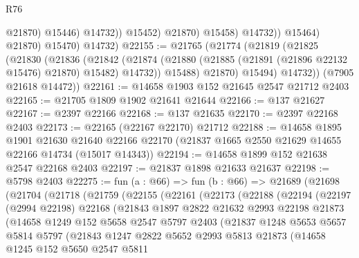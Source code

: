 \begin{lexlean}{R76}
\begin{coremodule}
                              @21870)
                            @15446)
                          @14732))
                      @15452)
                    @21870)
                  @15458)
                @14732))
            @15464)
          @21870)
        @15470)
      @14732)
@22155 := @21765
    (@21774
      (@21819
        (@21825
          (@21830
            (@21836
              (@21842
                (@21874 (@21880 (@21885 (@21891 (@21896 @22132 @15476) @21870) @15482) @14732))
                @15488)
              @21870)
            @15494)
          @14732))
      (@7905 @21618 @14472))
@22161 := @14658 @1903 @152 @21645 @2547 @21712 @2403
@22165 := @21705 @1809 @1902 @21641 @21644
@22166 := @137 @21627
@22167 := @2397 @22166
@22168 := @137 @21635
@22170 := @2397 @22168 @2403
@22173 := @22165 (@22167 @22170) @21712
@22188 := @14658
    @1895
    @1901
    @21630
    @21640
    @22166
    @22170
    (@21837 @1665 @2550 @21629 @14655 @22166 @14734 (@15017 @14343))
@22194 := @14658 @1899 @152 @21638 @2547 @22168 @2403
@22197 := @21837 @1898 @21633 @21637
@22198 := @5798 @2403
@22275 := fun (a : @66) =>
  fun (b : @66) =>
  @21689
    (@21698
      (@21704
        (@21718
          (@21759
            (@22155
              (@22161
                (@22173
                  (@22188
                    (@22194
                      (@22197
                        (@2994 @22198)
                        @22168
                        (@21843
                          @1897
                          @2822
                          @21632
                          @2993
                          @22198
                          @21873
                          (@14658
                            @1249
                            @152
                            @5658
                            @2547
                            @5797
                            @2403
                            (@21837
                              @1248
                              @5653
                              @5657
                              @5814
                              @5797
                              (@21843
                                @1247
                                @2822
                                @5652
                                @2993
                                @5813
                                @21873
                                (@14658
                                  @1245
                                  @152
                                  @5650
                                  @2547
                                  @5811

\end{coremodule}
\end{lexlean}

